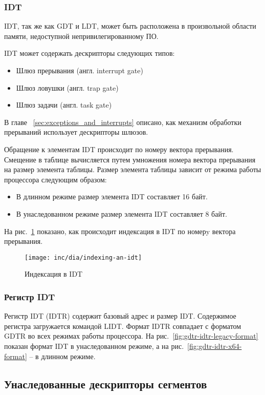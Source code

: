 \subsubsection*{IDT}
IDT, так же как GDT и LDT, может быть расположена в произвольной области памяти, недоступной непривилегированному ПО.

IDT может содержать дескрипторы следующих типов:
\begin{itemize}
	\item Шлюз прерывания (англ. interrupt gate)
	\item Шлюз ловушки (англ. trap gate)
	\item Шлюз задачи (англ. task gate)
\end{itemize}

В главе ~\ref{sec:exceptions_and_interrupts} описано,
как механизм обработки прерываний использует дескрипторы шлюзов.

Обращение к элементам IDT происходит по номеру вектора прерывания. Смещение в таблице вычисляется путем
умножения номера вектора прерывания на размер элемента таблицы. Размер элемента таблицы зависит от
режима работы процессора следующим образом:
\begin{itemize}
\item В длинном режиме размер элемента IDT составляет 16 байт.
\item В унаследованном режиме размер элемента IDT составляет 8 байт.
\end{itemize}

На рис.~\ref{fig:indexing-an-idt} показано, как происходит индексация в IDT по номерy вектора прерывания.

\begin{figure}[ht!]
  \centering
  \texttt{[image: inc/dia/indexing-an-idt]}
  \caption{Индексация в IDT}
  \label{fig:indexing-an-idt}
\end{figure}


\subsubsection*{Регистр IDT}
Регистр IDT (IDTR) содержит базовый адрес и размер IDT.
Содержимое регистра загружается командой LIDT. Формат IDTR совпадает с форматом GDTR во
всех режимах работы процессора. На рис.~\ref{fig:gdtr-idtr-legacy-format} показан формат
IDT в унаследованном режиме, а на рис.~\ref{fig:gdtr-idtr-x64-format} -- в длинном режиме.

\subsection{Унаследованные дескрипторы сегментов}
